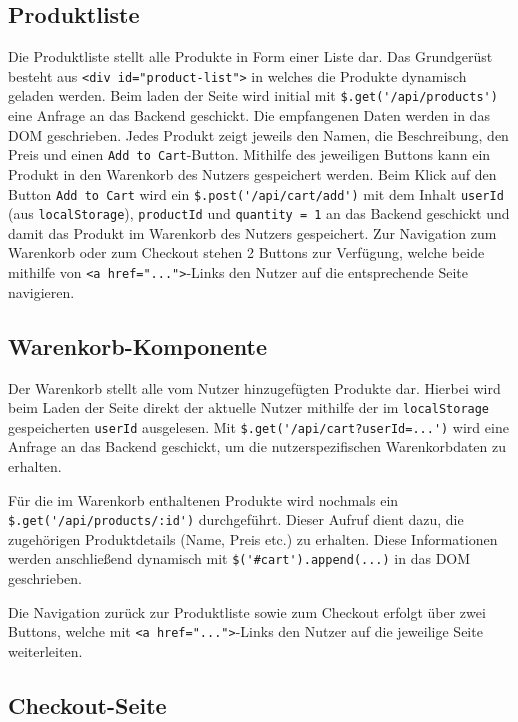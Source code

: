 \documentclass[oneside]{ausarbeitung}
\begin{document}
\subsection{Produktliste}

Die Produktliste stellt alle Produkte in Form einer Liste dar. Das Grundgerüst besteht aus \texttt{<div id="product-list">} in welches die Produkte dynamisch geladen werden. Beim laden der Seite wird initial mit \verb|$.get('/api/products')| eine Anfrage an das Backend geschickt. Die empfangenen Daten werden in das DOM geschrieben. Jedes Produkt zeigt jeweils den Namen, die Beschreibung, den Preis und einen \texttt{Add to Cart}-Button. 
Mithilfe des jeweiligen Buttons kann ein Produkt in den Warenkorb des Nutzers gespeichert werden. Beim Klick auf den Button \texttt{Add to Cart} wird ein \verb|$.post('/api/cart/add')| mit dem Inhalt \texttt{userId} (aus \texttt{localStorage}), \texttt{productId} und \texttt{quantity = 1} an das Backend geschickt und damit das Produkt im Warenkorb des Nutzers gespeichert.
Zur Navigation zum Warenkorb oder zum Checkout stehen 2 Buttons zur Verfügung, welche beide mithilfe von \texttt{<a href="...">}-Links den Nutzer auf die entsprechende Seite navigieren. 

\subsection{Warenkorb-Komponente}

Der Warenkorb stellt alle vom Nutzer hinzugefügten Produkte dar. Hierbei wird beim Laden der Seite direkt der aktuelle Nutzer mithilfe der im \texttt{localStorage} gespeicherten \texttt{userId} ausgelesen. Mit \verb|$.get('/api/cart?userId=...')| wird eine Anfrage an das Backend geschickt, um die nutzerspezifischen Warenkorbdaten zu erhalten.

Für die im Warenkorb enthaltenen Produkte wird nochmals ein \verb|$.get('/api/products/:id')| durchgeführt. Dieser Aufruf dient dazu, die zugehörigen Produktdetails (Name, Preis etc.) zu erhalten. Diese Informationen werden anschließend dynamisch mit \verb|$('#cart').append(...)| in das DOM geschrieben.

Die Navigation zurück zur Produktliste sowie zum Checkout erfolgt über zwei Buttons, welche mit \texttt{<a href="...">}-Links den Nutzer auf die jeweilige Seite weiterleiten.


\subsection{Checkout-Seite}
\end{document}
